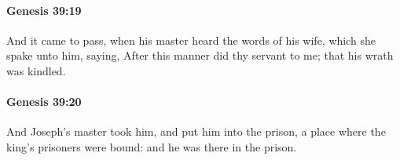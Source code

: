 		\paragraph{Genesis 39:19} %
			\label{GENESIS-39-19}

			And it came to pass, when his master heard the words of his wife, which she spake unto him, saying, After this manner did thy servant to me; that his wrath was kindled.


		\paragraph{Genesis 39:20} %
			\label{GENESIS-39-20}

			And Joseph's master took him, and put him into the prison, a place where the king's prisoners were bound: and he was there in the prison.


